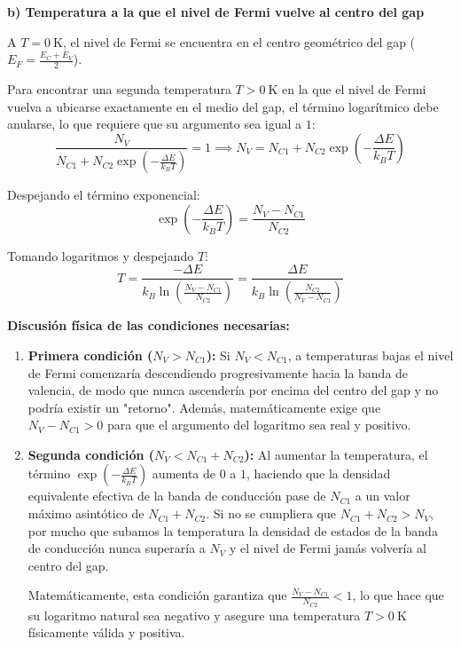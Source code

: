 \begin{problema}
\textbf{b) Temperatura a la que el nivel de Fermi vuelve al centro del gap}

A $T = \SI{0}{\kelvin}$, el nivel de Fermi se encuentra en el centro geométrico del gap ($E_F = \frac{E_C + E_V}{2}$).

Para encontrar una segunda temperatura $T > \SI{0}{\kelvin}$ en la que el nivel de Fermi vuelva a ubicarse exactamente en el medio del gap, el término logarítmico debe anularse, lo que requiere que su argumento sea igual a $1$:
\[
\frac{N_V}{N_{C1} + N_{C2} \exp\left( -\frac{\Delta E}{k_B T} \right)} = 1 \implies N_V = N_{C1} + N_{C2} \exp\left( -\frac{\Delta E}{k_B T} \right)
\]

Despejando el término exponencial:
\[
\exp\left( -\frac{\Delta E}{k_B T} \right) = \frac{N_V - N_{C1}}{N_{C2}}
\]

Tomando logaritmos y despejando $T$:
\[
T = \frac{-\Delta E}{k_B \ln\left( \frac{N_V - N_{C1}}{N_{C2}} \right)} = \frac{\Delta E}{k_B \ln\left( \frac{N_{C2}}{N_V - N_{C1}} \right)}
\]

\textbf{Discusión física de las condiciones necesarias:}

\begin{enumerate}
    \item \textbf{Primera condición ($N_V > N_{C1}$):} 
    Si $N_V < N_{C1}$, a temperaturas bajas el nivel de Fermi comenzaría descendiendo progresivamente hacia la banda de valencia, de modo que nunca ascendería por encima del centro del gap y no podría existir un "retorno". Además, matemáticamente exige que $N_V - N_{C1} > 0$ para que el argumento del logaritmo sea real y positivo.

    \item \textbf{Segunda condición ($N_V < N_{C1} + N_{C2}$):} 
    Al aumentar la temperatura, el término $\exp\left(-\frac{\Delta E}{k_B T}\right)$ aumenta de $0$ a $1$, haciendo que la densidad equivalente efectiva de la banda de conducción pase de $N_{C1}$ a un valor máximo asintótico de $N_{C1} + N_{C2}$. Si no se cumpliera que $N_{C1} + N_{C2} > N_V$, por mucho que subamos la temperatura la densidad de estados de la banda de conducción nunca superaría a $N_V$ y el nivel de Fermi jamás volvería al centro del gap. 
    
    Matemáticamente, esta condición garantiza que $\frac{N_V - N_{C1}}{N_{C2}} < 1$, lo que hace que su logaritmo natural sea negativo y asegure una temperatura $T > \SI{0}{\kelvin}$ físicamente válida y positiva.
\end{enumerate}
\end{problema}

